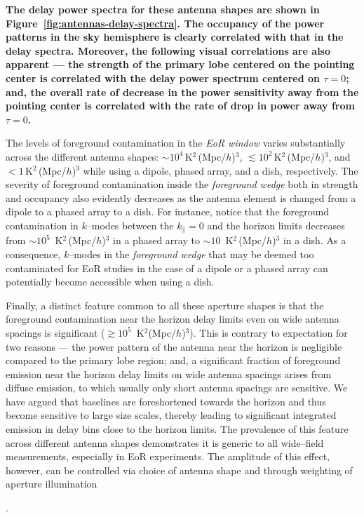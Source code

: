 \documentclass[preprint2,iop,numberedappendix]{emulateapj}
\begin{document}
{\bf The delay power spectra for these antenna shapes are shown in Figure~\ref{fig:antennas-delay-spectra}. The occupancy of the power patterns in the sky hemisphere is clearly correlated with that in the delay spectra. Moreover, the following visual correlations are also apparent --- the strength of the primary lobe centered on the pointing center is correlated with the delay power spectrum centered on $\tau=0$; and, the overall rate of decrease in the power sensitivity away from the pointing center is correlated with the rate of drop in power away from $\tau=0$. 

The levels of foreground contamination in the {\it EoR window} varies substantially across the different antenna shapes: $\sim 10^4\,$K$^2\,$(Mpc/$h$)$^3$, $\lesssim 10^2\,$K$^2\,$(Mpc/$h$)$^3$, and $<1\,$K$^2\,$(Mpc/$h$)$^3$ while using a dipole, phased array, and a dish, respectively. The severity of foreground contamination inside the {\it foreground wedge} both in strength and occupancy also evidently decreases as the antenna element is changed from a dipole to a phased array to a dish. For instance, notice that the foreground contamination in $k$--modes between the $k_\parallel=0$ and the horizon limits decreases from $\sim 10^5$~K$^2\,$(Mpc/$h$)$^3$ in a phased array to $\sim 10$~K$^2\,$(Mpc/$h$)$^3$ in a dish. As a consequence, $k$--modes in the {\it foreground wedge} that may be deemed too contaminated for EoR studies in the case of a dipole or a phased array can potentially become accessible when using a dish.

Finally, a distinct feature common to all these aperture shapes is that the foreground contamination near the horizon delay limits even on wide antenna spacings is significant ($\gtrsim 10^5$~K$^2$(Mpc/$h$)$^3$). This is contrary to expectation for two reasons --- the power pattern of the antenna near the horizon is negligible compared to the primary lobe region; and, a significant fraction of foreground emission near the horizon delay limits on wide antenna spacings arises from diffuse emission, to which usually only short antenna spacings are sensitive. We have argued that baselines are foreshortened towards the horizon and thus become sensitive to large size scales, thereby leading to significant integrated emission in delay bins close to the horizon limits. The prevalence of this feature across different antenna shapes demonstrates it is generic to all wide--field measurements, especially in EoR experiments. The amplitude of this effect, however, can be controlled via choice of antenna shape and through weighting of aperture illumination}.
\end{document}

